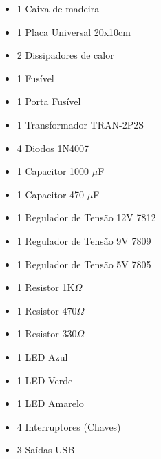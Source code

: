 \begin{itemize}[noitemsep]
\item 1 Caixa de madeira
\item 1 Placa Universal 20x10cm
\item 2 Dissipadores de calor
\item 1 Fusível
\item 1 Porta Fusível
\item 1 Transformador TRAN-2P2S
\item 4 Diodos 1N4007
\item 1 Capacitor 1000 $\mu$F
\item 1 Capacitor 470 $\mu$F
\item 1 Regulador de Tensão 12V 7812
\item 1 Regulador de Tensão 9V 7809
\item 1 Regulador de Tensão 5V 7805
\item 1 Resistor 1K$\Omega$
\item 1 Resistor 470$\Omega$
\item 1 Resistor 330$\Omega$
\item 1 LED Azul
\item 1 LED Verde
\item 1 LED Amarelo
\item 4 Interruptores (Chaves)
\item 3 Saídas USB
\end{itemize}